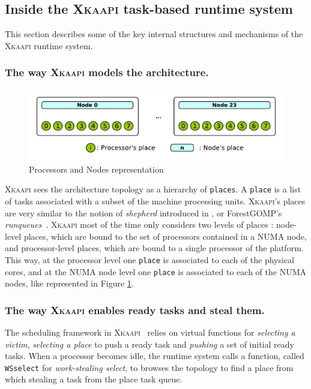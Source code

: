 \documentclass{Styles/llncs}
\newcommand{\kaapi}{\textsc{\mbox{Xkaapi}}\xspace}
\begin{document}
\subsection{Inside the \kaapi task-based runtime system}

This section describes some of the key internal structures and mechanisms of the \kaapi runtime system.

\subsubsection{The way \kaapi models the architecture.}

\begin{figure}[t]
  \centering
  \includegraphics[scale=0.5]{./figures/topology.pdf}
\caption{Processors and Nodes representation}
\label{fig:detail-topology}
\end{figure}

\kaapi sees the architecture topology as a hierarchy of \verb/places/.
A \verb/place/ is a list of tasks associated with a subset of the machine processing units.
\kaapi's places are very similar to the notion of \emph{shepherd} introduced in \cite{DBLP:journals/ijhpca/OlivierPWSP12}, or ForestGOMP's \emph{runqueues}~\cite{BroFurGogWacNam10IJPP}.
\kaapi most of the time only considers two levels of places : node-level places, which are bound to the set of processors contained in a NUMA node, and processor-level places, which are bound to a single processor of the platform.
This way, at the processor level one \verb/place/ is associated to each of the physical cores, and
at the NUMA node level one \verb/place/ is associated to each of the NUMA nodes, like represented in
Figure \ref{fig:detail-topology}.


\subsubsection{The way \kaapi enables ready tasks and steal them.}
The scheduling framework in \kaapi~\cite{Bleuse2014} relies on virtual functions for \textit{selecting a victim}, \textit{selecting a place} to push a ready task and \textit{pushing} a set of initial ready tasks.
When a processor becomes idle, the runtime system calls a function, called  \verb/WSselect/ for \emph{work-stealing select}, to browses the topology to find a place from which stealing a task from the place task queue.
\end{document}
